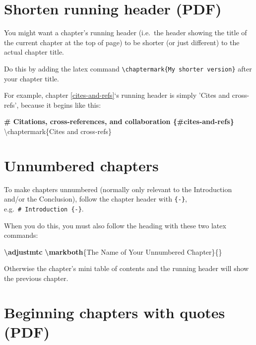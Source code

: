 \documentclass[a4paper, nobind]{templates/ociamthesis}
\newenvironment{Shaded}{\begin{snugshade}}{\end{snugshade}}
\newcommand{\FunctionTok}[1]{\textcolor[rgb]{0.13,0.29,0.53}{\textbf{#1}}}
\newcommand{\NormalTok}[1]{#1}
\renewenvironment{Shaded}
{
  \vspace{10pt}%
  \begin{snugshade}%
}{%
  \end{snugshade}%
  \vspace{8pt}%
}
\begin{document}
\section{Shorten running header (PDF)}\label{shorten-running-header-pdf}

You might want a chapter's running header (i.e.~the header showing the title of the current chapter at the top of page) to be shorter (or just different) to the actual chapter title.

Do this by adding the latex command \texttt{\textbackslash{}chaptermark\{My\ shorter\ version\}} after your chapter title.

For example, chapter \ref{cites-and-refs}`s running header is simply 'Cites and cross-refs', because it begins like this:

\begin{Shaded}
\begin{Highlighting}[]
\FunctionTok{\# Citations, cross{-}references, and collaboration \{\#cites{-}and{-}refs\} }
\NormalTok{\textbackslash{}chaptermark\{Cites and cross{-}refs\}}
\end{Highlighting}
\end{Shaded}

\section{Unnumbered chapters}\label{unnumbered-chapters}

To make chapters unnumbered (normally only relevant to the Introduction and/or the Conclusion), follow the chapter header with \texttt{\{-\}}, e.g.~\texttt{\#\ Introduction\ \{-\}}.

When you do this, you must also follow the heading with these two latex commands:

\begin{Shaded}
\begin{Highlighting}[]
\FunctionTok{\textbackslash{}adjustmtc}
\FunctionTok{\textbackslash{}markboth}\NormalTok{\{The Name of Your Unnumbered Chapter\}\{\}}
\end{Highlighting}
\end{Shaded}

Otherwise the chapter's mini table of contents and the running header will show the previous chapter.

\section{Beginning chapters with quotes (PDF)}\label{beginning-chapters-with-quotes-pdf}
\end{document}
